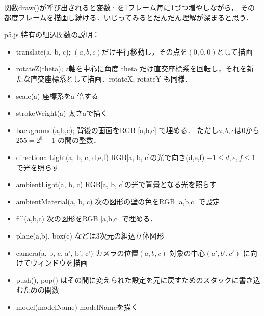 関数draw()が呼び出されると変数 i を1フレーム毎に1づつ増やしながら，
その都度フレームを描画し続ける．いじってみるとだんだん理解が深まると思う．

\emptyline

p5.js 特有の組込関数の説明：
\begin{itemize}
   \item
      translate(a, b, c); $(a, b,c)$だけ平行移動し，その点を$(0,0,0)$として描画
   
   \item
      rotateZ(theta); $z$軸を中心に角度 theta だけ直交座標系を回転し，それを新たな直交座標系として描画．rotateX, rotateY も同様．
   \item
      scale(a) 座標系をa 倍する
   
   \item  
      strokeWeight(a) 太さaで描く
     
   \item
      background(a,b,c);  背後の画面をRGB [a,b,c] で埋める．
      ただし$a, b, c$は$0$から$255=2^8-1$ の間の整数．
   
   \item directionalLight(a, b, c, d,e,f) RGB[a, b, c]の光で向き(d,e,f) $-1\le d,e,f\le 1$ で光を照らす
   
   \item
       ambientLight(a, b, c) RGB[a, b, c]の光で背景となる光を照らす
       
    \item 
       ambientMaterial(a, b, c) 次の図形の壁の色をRGB [a,b,c] で設定
   
   \item 
      fill(a,b,c) 次の図形をRGB [a,b,c] で埋める．
   
   \item 
      plane(a,b), box(c) などは3次元の組込立体図形
   
   \item
      camera(a, b, c, a', b', c') カメラの位置$(a, b, c)$ 対象の中心$(a', b', c')$ に向けてウィンドウを描画
   
   \item
      push(), pop() はその間に変えられた設定を元に戻すためのスタックに書き込むための関数
   
   \item
      model(modelName) modelNameを描く

\end{itemize}



